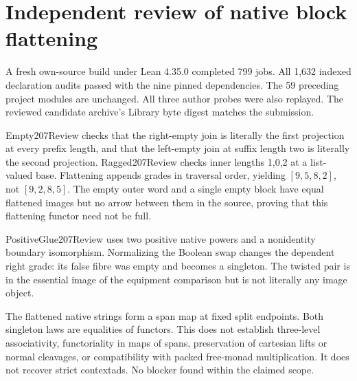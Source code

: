 \documentclass{article}
\begin{document}
\section*{Independent review of native block flattening}
A fresh own-source build under Lean 4.35.0 completed 799 jobs. All 1,632 indexed declaration audits passed with the nine pinned dependencies. The 59 preceding project modules are unchanged. All three author probes were also replayed. The reviewed candidate archive's Library byte digest matches the submission.
\par Empty207Review checks that the right-empty join is literally the first projection at every prefix length, and that the left-empty join at suffix length two is literally the second projection. Ragged207Review checks inner lengths 1,0,2 at a list-valued base. Flattening appends grades in traversal order, yielding $[9,5,8,2]$, not $[9,2,8,5]$. The empty outer word and a single empty block have equal flattened images but no arrow between them in the source, proving that this flattening functor need not be full.
\par PositiveGlue207Review uses two positive native powers and a nonidentity boundary isomorphism. Normalizing the Boolean swap changes the dependent right grade: its false fibre was empty and becomes a singleton. The twisted pair is in the essential image of the equipment comparison but is not literally any image object.
\par The flattened native strings form a span map at fixed split endpoints. Both singleton laws are equalities of functors. This does not establish three-level associativity, functoriality in maps of spans, preservation of cartesian lifts or normal cleavages, or compatibility with packed free-monad multiplication. It does not recover strict contextads. No blocker found within the claimed scope.
\end{document}

